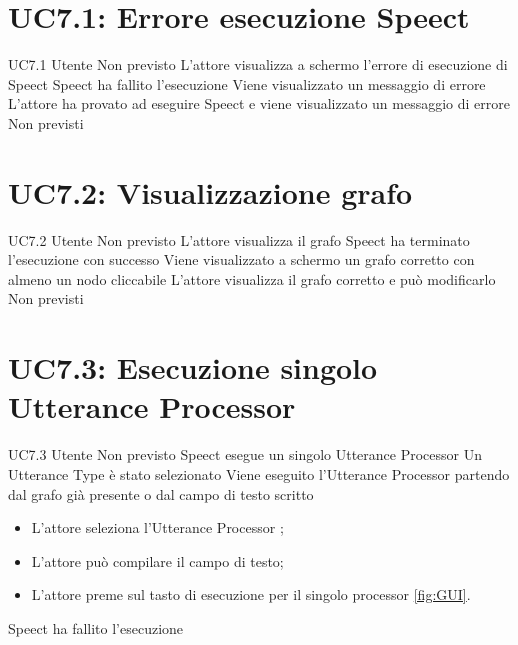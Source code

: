 \documentclass[../AnalisideiRequisiti.tex]{subfiles}
\begin{document}
\section{UC7.1: Errore esecuzione Speect}
\UserCase
{UC7.1}
{Utente}
{Non previsto}
{L'attore visualizza a schermo l'errore di esecuzione di Speect}
{Speect ha fallito l'esecuzione}
{Viene visualizzato un messaggio di errore}
{L'attore ha provato ad eseguire Speect e viene visualizzato un messaggio di errore}
{Non previsti}

\section{UC7.2: Visualizzazione grafo}
\UserCase
{UC7.2}
{Utente}
{Non previsto}
{L'attore visualizza il grafo}
{Speect ha terminato l'esecuzione con successo }
{Viene visualizzato a schermo un grafo corretto con almeno un nodo cliccabile}
{
	L'attore visualizza il grafo corretto e può modificarlo 
}
{Non previsti}

\section{UC7.3: Esecuzione singolo Utterance Processor}
\UserCase
{UC7.3}
{Utente}
{Non previsto}
{Speect esegue un singolo Utterance Processor}
{Un Utterance Type è stato selezionato  }
{Viene eseguito l'Utterance Processor partendo dal grafo già presente o dal campo di testo scritto}
{
	\begin{itemize}
		\item{} L'attore seleziona l'Utterance Processor ;
		\item{} L'attore può compilare il campo di testo;
		\item{} L'attore preme sul tasto di esecuzione per il singolo processor \ref{fig:GUI}.
	\end{itemize}
}
{Speect ha fallito l'esecuzione}
\end{document}
